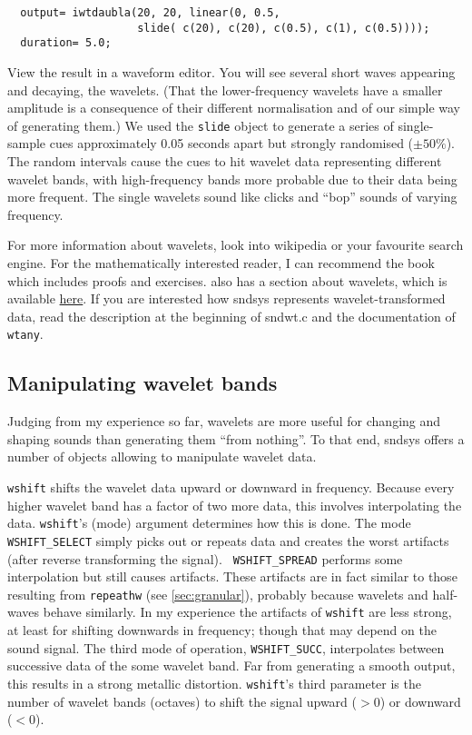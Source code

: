 \documentclass{article}
\def\s{{\sc sndsys} }
\def\bv{\begin{verbatim}}
\begin{document}
\bv
  output= iwtdaubla(20, 20, linear(0, 0.5, 
                    slide( c(20), c(20), c(0.5), c(1), c(0.5))));
  duration= 5.0;
\end{verbatim}

View the result in a waveform editor.  You will see several short waves
appearing and decaying, the wavelets.  (That the lower-frequency wavelets have
a smaller amplitude is a consequence of their different normalisation and of
our simple way of generating them.)  We used the {\tt slide} object to generate
a series of single-sample cues approximately 0.05 seconds apart but strongly
randomised ($\pm 50\%$).  The random intervals cause the cues to hit wavelet
data representing different wavelet bands, with high-frequency bands more
probable due to their data being more frequent.  The single wavelets sound like
clicks and ``bop'' sounds of varying frequency.

For more information about wavelets, look into wikipedia or your favourite
search engine.  For the mathematically interested reader, I can recommend the
book \cite{wm} which includes proofs and exercises.  \cite{nr} also has a
section about wavelets, which is available
\href{http://www.nrbook.com/b/bookcpdf/c13-10.pdf}{here}.
If you are interested how \s represents wavelet-transformed data, read the
description at the beginning of sndwt.c and the documentation of {\tt wtany}.


\subsection{Manipulating wavelet bands}

Judging from my experience so far, wavelets are more useful for changing and
shaping sounds than generating them ``from nothing''.  To that end, \s offers a
number of objects allowing to manipulate wavelet data.

{\tt wshift} shifts the wavelet data upward or downward in frequency.  Because
every higher wavelet band has a factor of two more data, this involves
interpolating the data.  {\tt wshift}'s (mode) argument determines how this is
done.  The mode {\tt WSHIFT\_SELECT} simply picks out or repeats data and
creates the worst artifacts (after reverse transforming the signal).  {\tt
WSHIFT\_SPREAD} performs some interpolation but still causes artifacts.  These
artifacts are in fact similar to those resulting from {\tt repeathw} (see
\autoref{sec:granular}), probably because wavelets and half-waves behave
similarly.  In my experience the artifacts of {\tt wshift} are less strong, at
least for shifting downwards in frequency; though that may depend on the sound
signal.  The third mode of operation, {\tt WSHIFT\_SUCC}, interpolates between
successive data of the some wavelet band.  Far from generating a smooth output,
this results in a strong metallic distortion.  {\tt wshift}'s third parameter
is the number of wavelet bands (octaves) to shift the signal upward ($>$0) or
downward ($<$0).
\end{document}
